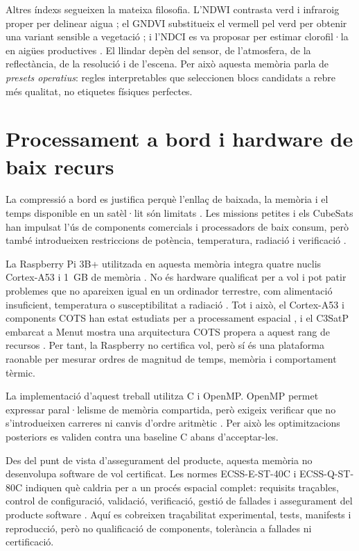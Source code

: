 Altres índexs segueixen la mateixa filosofia. L'NDWI contrasta verd i infraroig
proper per delinear aigua \cite{mcfeeters1996ndwi}; el GNDVI substitueix el
vermell pel verd per obtenir una variant sensible a vegetació
\cite{gitelson1996gndvi}; i l'NDCI es va proposar per estimar clorofil·la en
aigües productives \cite{mishra2012ndci}. El llindar depèn del sensor, de
l'atmosfera, de la reflectància, de la resolució i de l'escena. Per això
aquesta memòria parla de \emph{presets operatius}: regles interpretables que
seleccionen blocs candidats a rebre més qualitat, no etiquetes físiques
perfectes.

\section{Processament a bord i hardware de baix recurs}\label{sec:onboard_art}

La compressió a bord es justifica perquè l'enllaç de baixada, la memòria i el
temps disponible en un satèl·lit són limitats \cite{selva2012cubesats,
nasa2017cubesat}. Les missions petites i els CubeSats han impulsat l'ús de
components comercials i processadors de baix consum, però també introdueixen
restriccions de potència, temperatura, radiació i verificació
\cite{denis2017disruptions}.

La Raspberry Pi 3B+ utilitzada en aquesta memòria integra quatre nuclis
Cortex-A53 i 1~GB de memòria \cite{raspberry2018brief}. No és hardware
qualificat per a vol i pot patir problemes que no apareixen igual en un
ordinador terrestre, com alimentació insuficient, temperatura o susceptibilitat
a radiació \cite{guertin2021raspberry}. Tot i això, el Cortex-A53 i components
COTS han estat estudiats per a processament espacial \cite{schwaller2017a53},
i el C3SatP embarcat a Menut mostra una arquitectura COTS propera a aquest
rang de recursos \cite{serra2024c3satp}. Per tant, la Raspberry no certifica
vol, però sí és una plataforma raonable per mesurar ordres de magnitud de
temps, memòria i comportament tèrmic.

La implementació d'aquest treball utilitza C i OpenMP. OpenMP permet expressar
paral·lelisme de memòria compartida, però exigeix verificar que no s'introdueixen
carreres ni canvis d'ordre aritmètic \cite{openmp2021}. Per això les
optimitzacions posteriors es validen contra una baseline C abans d'acceptar-les.

Des del punt de vista d'assegurament del producte, aquesta memòria no
desenvolupa software de vol certificat. Les normes ECSS-E-ST-40C i
ECSS-Q-ST-80C indiquen què caldria per a un procés espacial complet:
requisits traçables, control de configuració, validació, verificació, gestió de
fallades i assegurament del producte software \cite{ecss40,ecss80}. Aquí es
cobreixen traçabilitat experimental, tests, manifests i reproducció, però no
qualificació de components, tolerància a fallades ni certificació.

